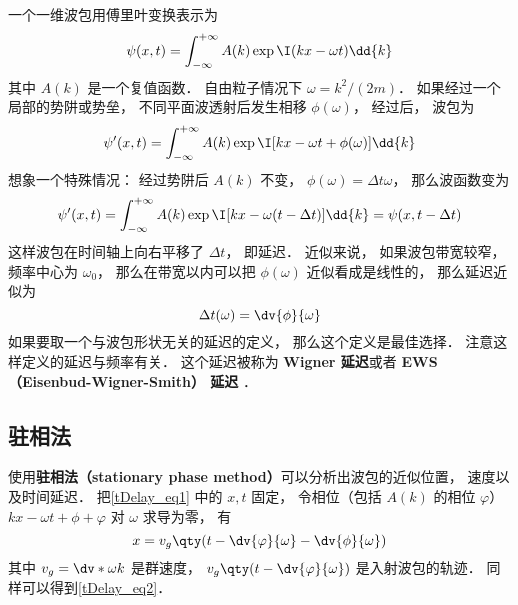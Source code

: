 
\begin{issues}
\issueDraft
\end{issues}

一个一维波包用傅里叶变换表示为
\begin{equation}
\psi(x, t) = \int_{-\infty}^{+\infty} A(k) \exp \I( kx - \omega t) \dd{k}
\end{equation}
其中 $A(k)$ 是一个复值函数． 自由粒子情况下 $\omega = k^2/(2m)$． 如果经过一个局部的势阱或势垒， 不同平面波透射后发生相移 $\phi(\omega)$， 经过后， 波包为
\begin{equation}\label{tDelay_eq1}
\psi'(x, t) = \int_{-\infty}^{+\infty} A(k) \exp \I[kx - \omega t + \phi(\omega)] \dd{k}
\end{equation}
想象一个特殊情况： 经过势阱后 $A(k)$ 不变， $\phi(\omega) = \Delta t \omega$， 那么波函数变为
\begin{equation}
\psi'(x, t) = \int_{-\infty}^{+\infty} A(k) \exp \I[kx - \omega (t - \Delta t) ] \dd{k}
= \psi(x, t - \Delta t)
\end{equation}
这样波包在时间轴上向右平移了 $\Delta t$， 即延迟． 近似来说， 如果波包带宽较窄， 频率中心为 $\omega_0$， 那么在带宽以内可以把 $\phi(\omega)$ 近似看成是线性的， 那么延迟近似为
\begin{equation}\label{tDelay_eq2}
\Delta t(\omega) = \dv{\phi}{\omega}
\end{equation}
如果要取一个与波包形状无关的延迟的定义， 那么这个定义是最佳选择． 注意这样定义的延迟与频率有关． 这个延迟被称为 \textbf{Wigner 延迟}或者 \textbf{EWS （Eisenbud-Wigner-Smith） 延迟} ．

\subsection{驻相法}
使用\textbf{驻相法（stationary phase method）}可以分析出波包的近似位置， 速度以及时间延迟． 把\autoref{tDelay_eq1} 中的 $x, t$ 固定， 令相位（包括 $A(k)$ 的相位 $\varphi$） $kx - \omega t + \phi + \varphi$ 对 $\omega$ 求导为零， 有
\begin{equation}
x = v_g \qty(t - \dv{\varphi}{\omega} - \dv{\phi}{\omega})
\end{equation}
其中 $v_g = \dv*{\omega}{k}$ 是群速度， $v_g \qty(t - \dv{\varphi}{\omega})$ 是入射波包的轨迹． 同样可以得到\autoref{tDelay_eq2}．
